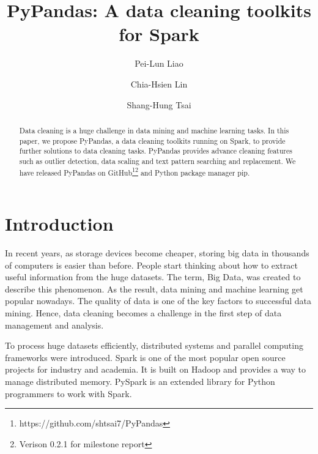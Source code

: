 \documentclass[sigconf]{acmart}
\begin{document}
\title{PyPandas: A data cleaning toolkits for Spark}

\author{Pei-Lun Liao}

\author{Chia-Hsien Lin}

\author{Shang-Hung Tsai}

\begin{abstract}
Data cleaning is a huge challenge in data mining and machine learning tasks. In this paper, we propose PyPandas, a data cleaning toolkits running on Spark, to provide further solutions to data cleaning tasks. PyPandas provides advance cleaning features such as outlier detection, data scaling and text pattern searching and replacement. We have released PyPandas on GitHub\footnote{https://github.com/shtsai7/PyPandas}\footnote{Verison 0.2.1 for milestone report} and Python package manager pip.
\end{abstract}

\maketitle

\section{Introduction}
In recent years, as storage devices become cheaper, storing big data in thousands of computers is easier than before. People start thinking about how to extract useful information from the huge datasets. The term, Big Data, was created to describe this phenomenon\cite{bigdata}. As the result, data mining\cite{Han, MMD} and machine learning\cite{ml} get popular nowadays. The quality of data is one of the key factors to successful data mining\cite{dataquality}. Hence, data cleaning becomes a challenge in the first step of data management and analysis\cite{datacleaning, DBS-045, PW}.
	
To process huge datasets efficiently, distributed systems and parallel computing frameworks\cite{mapreduce, gfs, hadoop} were introduced. Spark\cite{spark} is one of the most popular open source projects for industry and academia. It is built on Hadoop\cite{hadoop} and provides a way to manage distributed memory. PySpark\cite{pyspark} is an extended library for Python programmers to work with Spark.
	
\end{document}
